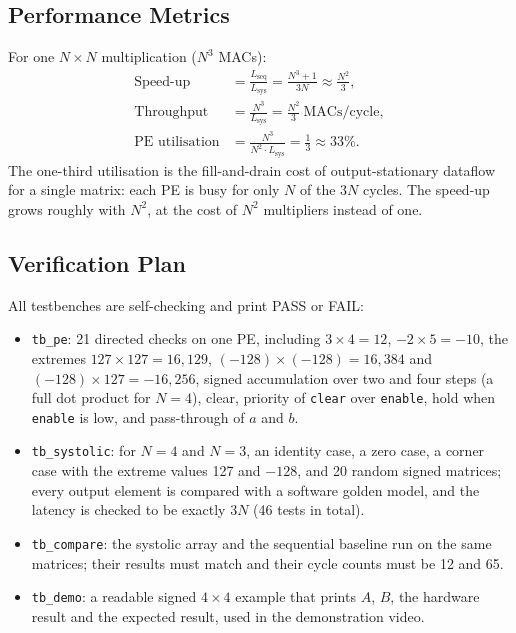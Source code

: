 \documentclass[conference,a4paper]{IEEEtran}
\begin{document}
\subsection{Performance Metrics}
\label{sec:metrics}
For one $N\times N$ multiplication ($N^3$ MACs):
\begin{align}
\text{Speed-up} &= \frac{L_{\text{seq}}}{L_{\text{sys}}} = \frac{N^3 + 1}{3N} \approx \frac{N^2}{3},\\
\text{Throughput} &= \frac{N^3}{L_{\text{sys}}} = \frac{N^2}{3}\ \text{MACs/cycle},\\
\text{PE utilisation} &= \frac{N^3}{N^2 \cdot L_{\text{sys}}} = \frac{1}{3} \approx 33\%.
\end{align}
The one-third utilisation is the fill-and-drain cost of output-stationary dataflow for a single matrix: each PE is busy for only $N$ of the $3N$ cycles. The speed-up grows roughly with $N^2$, at the cost of $N^2$ multipliers instead of one.

\subsection{Verification Plan}
All testbenches are self-checking and print PASS or FAIL:
\begin{itemize}
\item \texttt{tb\_pe}: 21 directed checks on one PE, including $3\times4 = 12$, $-2\times5 = -10$, the extremes $127\times127 = 16{,}129$, $(-128)\times(-128) = 16{,}384$ and $(-128)\times127 = -16{,}256$, signed accumulation over two and four steps (a full dot product for $N = 4$), clear, priority of \texttt{clear} over \texttt{enable}, hold when \texttt{enable} is low, and pass-through of $a$ and $b$.
\item \texttt{tb\_systolic}: for $N = 4$ and $N = 3$, an identity case, a zero case, a corner case with the extreme values 127 and $-128$, and 20 random signed matrices; every output element is compared with a software golden model, and the latency is checked to be exactly $3N$ (46 tests in total).
\item \texttt{tb\_compare}: the systolic array and the sequential baseline run on the same matrices; their results must match and their cycle counts must be 12 and 65.
\item \texttt{tb\_demo}: a readable signed $4\times4$ example that prints $A$, $B$, the hardware result and the expected result, used in the demonstration video.
\end{itemize}
\end{document}
